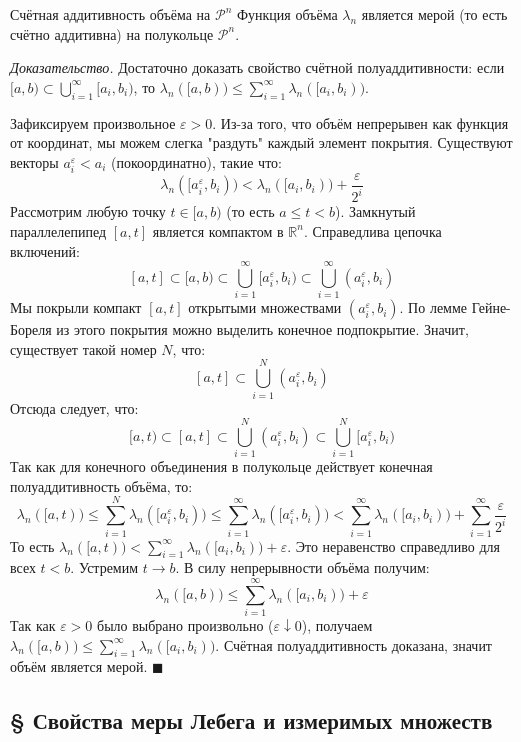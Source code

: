\documentclass[12pt,a4paper]{article}
\newenvironment{Proof}[1][Доказательство]{\vspace{0.5em}\noindent\textit{#1.}\hspace{0.5em}\ignorespaces}{\hfill$\blacksquare$\vspace{1em}}
\begin{document}
\begin{Theorem}{Счётная аддитивность объёма на $\mathcal{P}^n$}{}
Функция объёма $\lambda_n$ является мерой (то есть счётно аддитивна) на полукольце $\mathcal{P}^n$.
\end{Theorem}

\begin{Proof}
Достаточно доказать свойство счётной полуаддитивности: если $[a, b) \subset \bigcup\limits_{i=1}^{\infty} [a_i, b_i)$, то $\lambda_n([a, b)) \le \sum\limits_{i=1}^{\infty} \lambda_n([a_i, b_i))$.

Зафиксируем произвольное $\varepsilon > 0$. Из-за того, что объём непрерывен как функция от координат, мы можем слегка "раздуть" каждый элемент покрытия. Существуют векторы $a_i^\varepsilon < a_i$ (покоординатно), такие что:
$$ \lambda_n([a_i^\varepsilon, b_i)) < \lambda_n([a_i, b_i)) + \frac{\varepsilon}{2^i} $$
Рассмотрим любую точку $t \in [a, b)$ (то есть $a \le t < b$). Замкнутый параллелепипед $[a, t]$ является компактом в $\mathbb{R}^n$. 
Справедлива цепочка включений:
$$ [a, t] \subset [a, b) \subset \bigcup\limits_{i=1}^{\infty} [a_i^\varepsilon, b_i) \subset \bigcup\limits_{i=1}^{\infty} (a_i^\varepsilon, b_i) $$
Мы покрыли компакт $[a, t]$ открытыми множествами $(a_i^\varepsilon, b_i)$. По лемме Гейне-Бореля из этого покрытия можно выделить конечное подпокрытие. Значит, существует такой номер $N$, что:
$$ [a, t] \subset \bigcup\limits_{i=1}^N (a_i^\varepsilon, b_i) $$
Отсюда следует, что:
$$ [a, t) \subset [a, t] \subset \bigcup\limits_{i=1}^N (a_i^\varepsilon, b_i) \subset \bigcup\limits_{i=1}^N [a_i^\varepsilon, b_i) $$
Так как для конечного объединения в полукольце действует конечная полуаддитивность объёма, то:
$$ \lambda_n([a, t)) \le \sum\limits_{i=1}^N \lambda_n([a_i^\varepsilon, b_i)) \le \sum\limits_{i=1}^{\infty} \lambda_n([a_i^\varepsilon, b_i)) < \sum\limits_{i=1}^{\infty} \lambda_n([a_i, b_i)) + \sum\limits_{i=1}^{\infty} \frac{\varepsilon}{2^i} $$
То есть $\lambda_n([a, t)) < \sum\limits_{i=1}^{\infty} \lambda_n([a_i, b_i)) + \varepsilon$.
Это неравенство справедливо для всех $t < b$. Устремим $t \to b$. В силу непрерывности объёма получим:
$$ \lambda_n([a, b)) \le \sum\limits_{i=1}^{\infty} \lambda_n([a_i, b_i)) + \varepsilon $$
Так как $\varepsilon > 0$ было выбрано произвольно ($\varepsilon \downarrow 0$), получаем $\lambda_n([a, b)) \le \sum\limits_{i=1}^{\infty} \lambda_n([a_i, b_i))$. Счётная полуаддитивность доказана, значит объём является мерой.
\end{Proof}

\subsection{§ Свойства меры Лебега и измеримых множеств}
\end{document}
